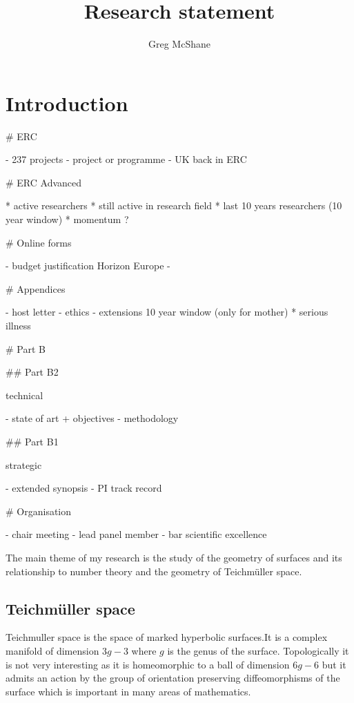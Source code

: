 \documentclass[12pt,a4paper]{amsart}
\title{Research statement}
\author[McShane]{Greg McShane}
\def\GG{\mathbb{G}}
\def\fp{\mathbb{F}_p}
\begin{document}
\maketitle

\section{Introduction}


# ERC

- 237 projects
- project or programme
- UK back in ERC

# ERC Advanced

* active researchers
* still active in research field
* last 10 years researchers (10 year window)
* momentum ?

# Online forms

- budget justification Horizon Europe
- 

# Appendices

- host letter
- ethics
- extensions 10 year window (only for mother)
	* serious illness

# Part B

## Part B2

technical

- state of art + objectives 
- methodology

## Part B1

strategic

- extended synopsis
- PI track record


# Organisation

- chair meeting
- lead panel member
- bar scientific excellence


The main theme of my research is the study of the geometry of
surfaces and its relationship to number theory and the geometry of Teichmüller space.

\subsection{Teichmüller space}

Teichmuller space is the space of marked hyperbolic surfaces.It is a
complex manifold of dimension $3g-3$ where $g$ is the genus of the
surface. Topologically it is not very interesting as it is
homeomorphic to a ball of dimension $6g-6$ but it admits an action
by the group of orientation preserving diffeomorphisms of
the surface which is important in many areas of mathematics.
\end{document}
